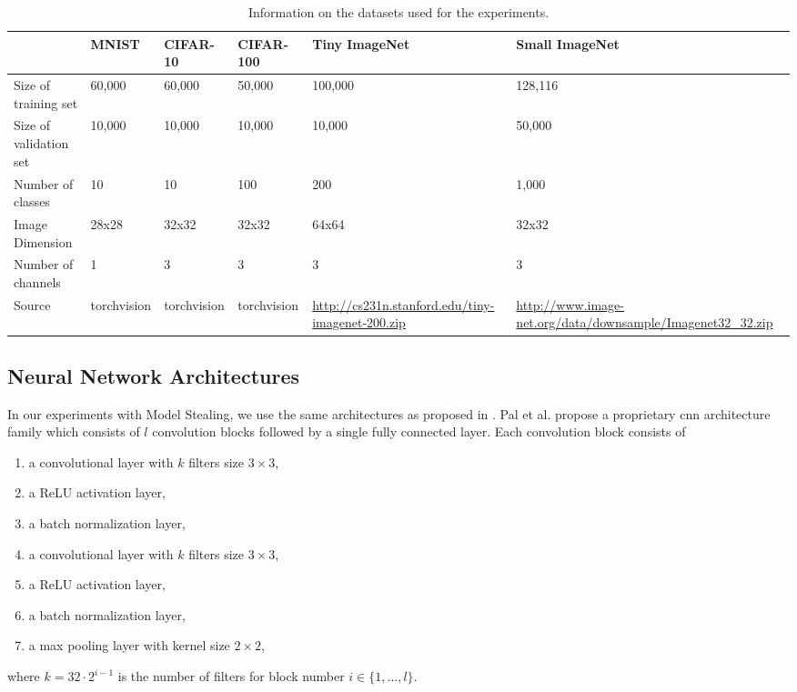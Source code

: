 \begin{table}[!htb]
    \centering
    \begin{tabularx}{\textwidth}{|X || X | X | X | X| X|}
        \hline
         & MNIST & CIFAR-10 & CIFAR-100 & Tiny \newline ImageNet & Small \newline ImageNet \\ 
        \hline 
        \hline
        Size of training set & 60,000 & 60,000& 50,000 & 100,000 & 128,116 \\ 
        \hline
        Size of validation set & 10,000 & 10,000 & 10,000 & 10,000 & 50,000\\
        \hline
        Number of classes & 10 & 10 & 100 & 200 & 1,000 \\
        \hline
        Image Dimension & 28x28 & 32x32 & 32x32 & 64x64& 32x32\\
        \hline
        Number of channels & 1 & 3 & 3 & 3 & 3 \\
        \hline
        Source & torchvision & torchvision & torchvision & {\small \url{http://cs231n.stanford.edu/tiny-imagenet-200.zip}} & {\small \url{http://www.image-net.org/data/downsample/Imagenet32_32.zip}} \\
        \hline
    \end{tabularx}
    \caption{Information on the datasets used for the experiments.}
    \label{fig:DatasetInformtion}
\end{table}

\subsection{Neural Network Architectures}
\label{sec:Appendix:Architectures}
In our experiments with Model Stealing, we use the same architectures as proposed in \cite{pal2020activethief}. Pal et al. propose a proprietary
\gls{cnn} architecture family which consists of $l$ convolution blocks followed by a single fully connected layer. Each convolution block consists
of 
\begin{enumerate}
    \item a convolutional layer with $k$ filters size $3 \times 3$,
    \item a ReLU activation layer,
    \item a batch normalization layer,
    \item a convolutional layer with $k$ filters size $3 \times 3$,
    \item a ReLU activation layer,
    \item a batch normalization layer,
    \item a max pooling layer with kernel size $2 \times 2$,
\end{enumerate}
where $k=32 \cdot 2^{i-1}$ is the number of filters for block number $i \in \{1,\ldots,l\}$.



